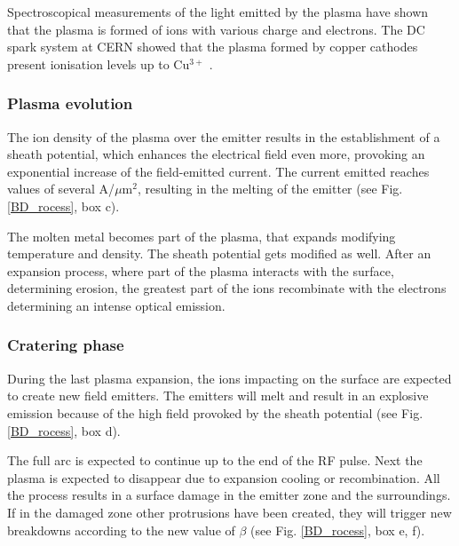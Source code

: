 Spectroscopical measurements of the light emitted by the plasma have shown that the plasma is formed of ions with various charge and electrons. The DC spark system at CERN showed that the plasma formed by copper cathodes present ionisation levels up to Cu$^{3+}$ \cite{Kovermann:1330346}.


\subsubsection[Plasma evolution]{Plasma evolution}

The ion density of the plasma over the emitter results in the establishment of a sheath potential, which enhances the electrical field even more, provoking an exponential  increase of the field-emitted current. The current emitted reaches values of several A/$\mu$m$^2$, resulting in the melting of the emitter (see Fig. \ref{BD_rocess}, box c).

The molten metal becomes part of the plasma, that expands modifying temperature and density. The sheath potential gets modified as well. After an expansion process, where part of the plasma interacts with the surface, determining erosion, the greatest part of the ions recombinate with the electrons determining an intense optical emission.


\subsubsection[Cratering phase]{Cratering phase}

During the last plasma expansion, the ions impacting on the surface are expected to create new field emitters. The emitters will melt and result in an explosive emission because of the high field provoked by the sheath potential (see Fig. \ref{BD_rocess}, box d). 

The full arc is expected to continue up to the end of the RF pulse. Next the plasma is expected to disappear due to expansion cooling or recombination. All the process results in a surface damage in the emitter zone and the surroundings. If in the damaged zone other protrusions have been created, they will trigger new breakdowns according to the new value of $\beta$ (see Fig. \ref{BD_rocess}, box e, f). 

